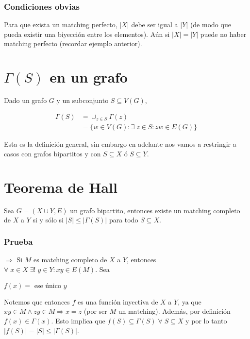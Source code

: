\documentclass[10pt,a4paper]{article}
\begin{document}
\subsubsection*{Condiciones obvias}

Para que exista un matching perfecto, $\lvert X \rvert$ debe ser igual a $\lvert Y \rvert$ (de modo que pueda existir una biyección entre los elementos). Aún si $\lvert X \rvert = \lvert Y \rvert$ puede no haber matching perfecto (recordar ejemplo anterior).

\section*{$\Gamma(S)$ en un grafo}

Dado un grafo $G$ y un subconjunto $S \subseteq V(G)$,

\begin{center}
\begin{align*} \Gamma(S) &= \cup_{z \in S} \Gamma(z)\\ &= \{w \in V(G) : \exists \; z \in S : zw \in E(G)\} \end{align*}
\end{center}

Esta es la definición general, sin embargo en adelante nos vamos a restringir a casos con grafos bipartitos y con $S \subseteq X$ ó $S \subseteq Y$.

\section*{Teorema de Hall}

Sea $G = (X \cup Y, E)$ un grafo bipartito, entonces existe un matching completo de $X$ a $Y$ si y sólo si $\lvert S \rvert \leq \lvert \Gamma(S)\rvert$ para todo $S \subseteq X$.

\subsubsection*{Prueba}

$\Rightarrow$ Si $M$ es matching completo de $X$ a $Y$, entonces $\forall \; x \in X \;\exists!\; y \in Y: xy \in E(M)$. Sea

\begin{center}
$f(x) = $ ese único $y$
\end{center}

Notemos que entonces $f$ es una función inyectiva de $X $ a $Y$, ya que $xy\in M \land zy \in M \Rightarrow x = z$ (por ser $M$ un matching). Además, por definición $f(x) \in \Gamma(x)$. Esto implica que $f(S) \subseteq \Gamma(S) \; \forall \; S \subseteq X$ y por lo tanto $\lvert f(S)\rvert= \lvert S \rvert \leq \lvert \Gamma(S)\rvert$.
\end{document}
